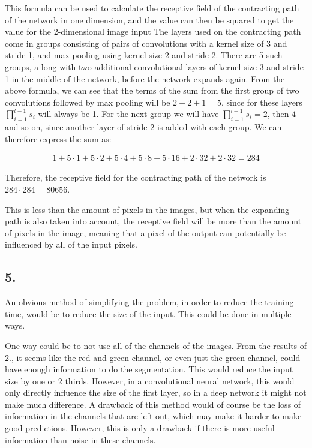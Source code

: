 \documentclass[a4paper, 12pt]{article}
\begin{document}
This formula can be used to calculate the receptive field of the contracting path of the network in one dimension, and the value can then be squared to get the value for the 2-dimensional image input
The layers used on the contracting path come in groups consisting of pairs of convolutions with a kernel size of 3 and stride 1, and max-pooling using kernel size 2 and stride 2. There are 5 such groups, a long with two additional convolutional layers of kernel size 3 and stride 1 in the middle of the network, before the network expands again. From the above formula, we can see that the terms of the sum from the first group of two convolutions followed by max pooling will be $2 + 2 + 1 = 5$, since for these layers $\prod_{i=1}^{l - 1} s_i$ will always be 1. For the next group we will have $\prod_{i=1}^{l - 1} s_i = 2$, then $4$ and so on, since another layer of stride $2$ is added with each group. We can therefore express the sum as:

\begin{align}
	1 + 5 \cdot 1 + 5 \cdot 2 + 5 \cdot 4 + 5 \cdot 8 + 5 \cdot 16 + 2 \cdot 32 + 2 \cdot 32 = 284
\end{align}

Therefore, the receptive field for the contracting path of the network is $284 \cdot 284 = 80656$.

This is less than the amount of pixels in the images, but when the expanding path is also taken into account, the receptive field will be more than the amount of pixels in the image, meaning that a pixel of the output can potentially be influenced by all of the input pixels. 

\subsection{5.}

An obvious method of simplifying the problem, in order to reduce the training time, would be to reduce the size of the input. This could be done in multiple ways. 

One way could be to not use all of the channels of the images. From the results of 2., it seems like the red and green channel, or even just the green channel, could have enough information to do the segmentation. This would reduce the input size by one or 2 thirds. However, in a convolutional neural network, this would only directly influence the size of the first layer, so in a deep network it might not make much difference. A drawback of this method would of course be the loss of information in the channels that are left out, which may make it harder to make good predictions. However, this is only a drawback if there is more useful information than noise in these channels. 
\end{document}
